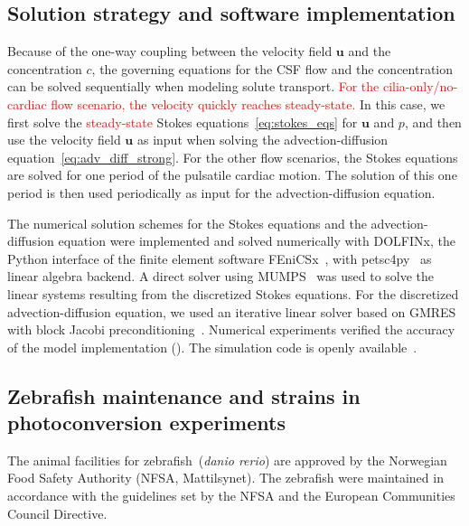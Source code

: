 \documentclass[fleqn]{wlscirep}
\newcommand{\uu}{\mathbf{u}}
\newcommand{\fixme}[1]{\textcolor{red}{#1}}
\begin{document}
\subsection*{Solution strategy and software implementation}
Because of the one-way coupling between the velocity field $\uu$ and the concentration $c$, the governing equations for the CSF flow and the concentration can be solved sequentially when modeling solute transport.
\fixme{For the cilia-only/no-cardiac flow scenario, the velocity quickly reaches steady-state.} In this case, we first solve the \fixme{steady-state} Stokes equations~\eqref{eq:stokes_eqs} for $\uu$ and $p$,
and then use the velocity field $\uu$ as input when solving the advection-diffusion equation~\eqref{eq:adv_diff_strong}.
For the other flow scenarios, the Stokes equations are solved for one period of the pulsatile cardiac motion. The solution of this one period is then used periodically as input for the advection-diffusion equation.

The numerical solution schemes for the Stokes equations and the advection-diffusion equation were implemented and solved numerically with DOLFINx,
the Python interface of the finite element software FEniCSx~\cite{TheFEniCSProject2024FEniCSxDocumentation}, with petsc4py~\cite{Dalcin2011ParallelPython} as linear algebra backend.
A direct solver using MUMPS~\cite{Amestoy2011Mumps} was used to solve the linear systems resulting from the discretized Stokes equations.
For the discretized advection-diffusion equation, we used an iterative linear solver based on GMRES~\cite{Saad1986GMRES:Systems} with block Jacobi preconditioning~\cite{Jacobi1845UeberGleichungen}.
Numerical experiments verified the accuracy of the model implementation (). The simulation code is openly available~\cite{zenodo-link-to-all-code}. 

\subsection*{Zebrafish maintenance and strains in photoconversion experiments}
The animal facilities for zebrafish~(\emph{danio rerio}) are approved by the Norwegian Food Safety Authority (NFSA, Mattilsynet).
The zebrafish were maintained in accordance with the guidelines set by the NFSA and the European Communities Council Directive.
\end{document}
